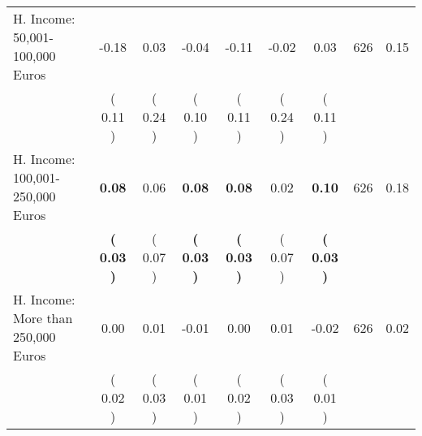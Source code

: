 \begin{tabular}{lcccccccc}
H. Income: 50,001-100,000 Euros &     -0.18 &      0.03 &     -0.04 &     -0.11 &     -0.02 &      0.03 & 626 &       0.15 \\ 
 & (     0.11 ) & (     0.24 ) & (     0.10 ) & (     0.11 ) & (     0.24 ) & (     0.11 ) & \\
H. Income: 100,001-250,000 Euros & \textbf{     0.08} &      0.06 & \textbf{     0.08} & \textbf{     0.08} &      0.02 & \textbf{     0.10} & 626 &       0.18 \\ 
 & \textbf{(     0.03 )} & (     0.07 ) & \textbf{(     0.03 )} & \textbf{(     0.03 )} & (     0.07 ) & \textbf{(     0.03 )} & \\
H. Income: More than 250,000 Euros &      0.00 &      0.01 &     -0.01 &      0.00 &      0.01 &     -0.02 & 626 &       0.02 \\ 
 & (     0.02 ) & (     0.03 ) & (     0.01 ) & (     0.02 ) & (     0.03 ) & (     0.01 ) & \\
\bottomrule
\end{tabular}

